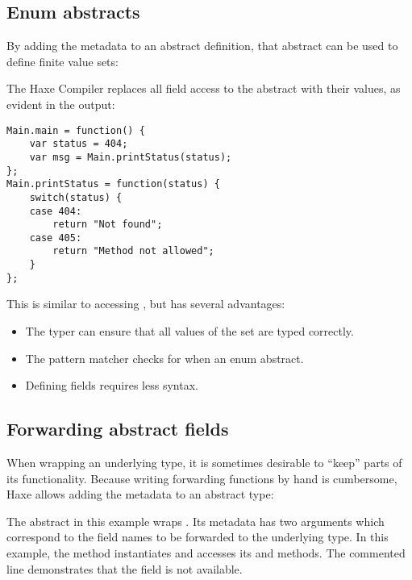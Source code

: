 \subsection{Enum abstracts}
\label{types-abstract-enum}

By adding the  metadata to an abstract definition, that abstract can be used to define finite value sets:


The Haxe Compiler replaces all field access to the  abstract with their values, as evident in the  output:

\begin{lstlisting}
Main.main = function() {
	var status = 404;
	var msg = Main.printStatus(status);
};
Main.printStatus = function(status) {
	switch(status) {
	case 404:
		return "Not found";
	case 405:
		return "Method not allowed";
	}
};
\end{lstlisting}

This is similar to accessing , but has several advantages:

\begin{itemize}
	\item The typer can ensure that all values of the set are typed correctly.
	\item The pattern matcher checks for  when  an enum abstract.
	\item Defining fields requires less syntax.
\end{itemize}


\subsection{Forwarding abstract fields}
\label{types-abstract-forward}

When wrapping an underlying type, it is sometimes desirable to ``keep'' parts of its functionality. Because writing forwarding functions by hand is cumbersome, Haxe allows adding the  metadata to an abstract type:


The  abstract in this example wraps . Its  metadata has two arguments which correspond to the field names to be forwarded to the underlying type. In this example, the  method instantiates  and accesses its  and  methods. The commented line demonstrates that the  field is not available.

